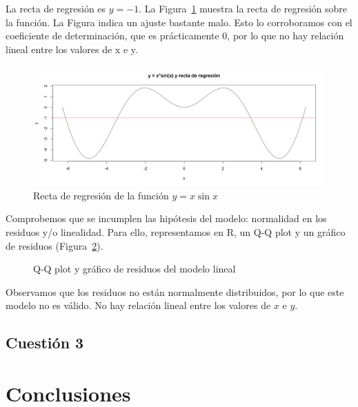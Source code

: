\documentclass[12pt,a4paper,twoside,openright,titlepage,final]{article}
\begin{document}
La recta de regresión es $y=-1$. La Figura~\ref{fig:recta} muestra la recta de regresión sobre la función. La Figura indica un ajuste bastante malo. Esto lo corroboramos con el coeficiente de determinación, que es prácticamente 0, por lo que no hay relación lineal entre los valores de x e y.\\ 

\begin{figure}[tbph!]
\centering
\includegraphics[width=0.8\linewidth]{imagenes/recta}
\caption{Recta de regresión de la función $y=x\sin x$}
\label{fig:recta}
\end{figure}

Comprobemos que se incumplen las hipótesis del modelo: normalidad en los residuos y/o linealidad. Para ello, representamos en R, un Q-Q plot y un gráfico de residuos (Figura~\ref{fig:residuos}).\\

\begin{figure}[htbp!]
\centering
{}
\caption{Q-Q plot y gráfico de residuos del modelo lineal} \label{fig:residuos}
\end{figure}

Observamos que los residuos no están normalmente distribuidos, por lo que este modelo no es válido. No hay relación lineal entre los valores de $x$ e $y$.

\subsection{Cuestión 3}



\section{Conclusiones}
\end{document}

